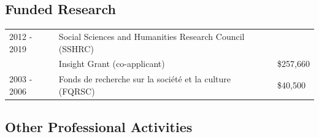 \documentclass[12pt]{article}
\begin{document}








\subsection*{Funded Research}

\begin{tabular}{lll}
2012 - 2019
& Social Sciences and Humanities Research Council (SSHRC) \\
& Insight Grant (co-applicant)
& \$257,660 \\
2003 - 2006
& Fonds de recherche sur la soci\'et\'e et la culture (FQRSC)
& \$40,500 \\
\end{tabular}

\subsection*{Other Professional Activities}
\end{document}
